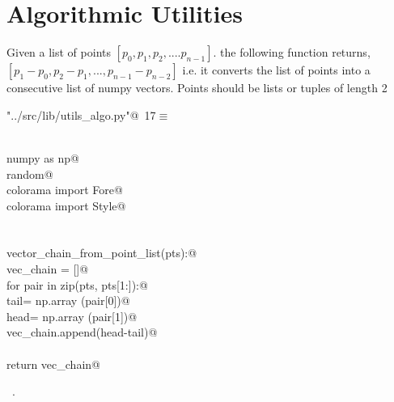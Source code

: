 \documentclass[11.5pt]{report}
\begin{document}
\section{Algorithmic Utilities}

\newchunk Given a list of  points $[p_0,p_1,p_2,....p_{n-1}]$. 
    the following function returns, $[p_1-p_0, p_2-p_1,...,p_{n-1}-p_{n-2}]$
    i.e. it converts the list of points into a consecutive list of numpy vectors. 
    Points should be lists or tuples of length 2

\begin{flushleft} \small\label{scrap12}\raggedright\small
{} \verb@"../src/lib/utils_algo.py"@\nobreak\ {\footnotesize {17}}$\equiv$
\vspace{-1ex}
\begin{list}{}{} \item
\mbox{}\verb@@\\
\mbox{}\verb@import numpy as np@\\
\mbox{}\verb@import random@\\
\mbox{}\verb@from colorama import Fore@\\
\mbox{}\verb@from colorama import Style@\\
\mbox{}\verb@@\\
\mbox{}\verb@@\\
\mbox{}\verb@def vector_chain_from_point_list(pts):@\\
\mbox{}\verb@    vec_chain = []@\\
\mbox{}\verb@    for pair in zip(pts, pts[1:]):@\\
\mbox{}\verb@        tail= np.array (pair[0])@\\
\mbox{}\verb@        head= np.array (pair[1])@\\
\mbox{}\verb@        vec_chain.append(head-tail)@\\
\mbox{}\verb@@\\
\mbox{}\verb@    return vec_chain@\\
\mbox{}\verb@@{\NWsep}
\end{list}
\vspace{-1.5ex}
\footnotesize
\begin{list}{}{\setlength{\itemsep}{-\parsep}\setlength{\itemindent}{-\leftmargin}}
\item \NWtxtFileDefBy\ .

\item{}
\end{list}
\vspace{4ex}
\end{flushleft}
\end{document}
